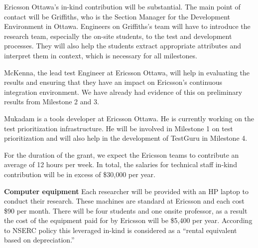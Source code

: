 \documentclass[12pt, letterpaper]{article}
\begin{document}
\fancyhead{}
\pagestyle{fancy}
\renewcommand{\headrulewidth}{0pt}

\begin{center}
\begin{LARGE}
\noindent
{}
\end{LARGE}
\end{center}


Ericsson Ottawa's in-kind contribution will be substantial. The main point of
contact will be Griffiths, who is the Section Manager for the Development
Environment in Ottawa. Engineers on Griffiths's team will have to introduce the
research team, especially the on-site students, to the test and development
processes. They will also help the students extract appropriate attributes and
interpret them in context, which is necessary for all milestones.

McKenna, the lead test Engineer at Ericsson Ottawa, will help in evaluating the
results and ensuring that they have an impact on Ericsson's continuous
integration environment. We have already had evidence of this on preliminary results from Milestone 2 and 3. 

Mukadam is a tools developer at Ericsson Ottawa. He is currently working on the test prioritization infrastructure. He will be involved in Milestone 1 on test prioritization and will also help in the development of TestGuru in Milestone 4.

For the duration of the grant, we expect the Ericsson teams to contribute an
average of 12 hours per week. In total, the salaries for technical staff in-kind contribution will be in excess of \$30,000 per year.

\textbf{Computer equipment}
Each researcher will be provided with an HP laptop to conduct their research. These machines are standard at Ericsson and each cost \$90 per month. There will be four students and one onsite professor, as a result the cost of the equipment paid for by Ericsson will be \$5,400 per year. According to NSERC policy this leveraged in-kind is considered as a ``rental equivalent based on depreciation.''

%
\end{document}
